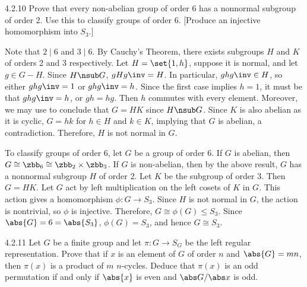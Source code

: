 \begin{exercise}{4.2.10}
	Prove that every non-abelian group of order 6 has a nonnormal subgroup of order 2.
	Use this to classify groups of order 6. [Produce an injective homomorphism into $S_3$.]
\end{exercise}

\begin{sol}
	Note that $2 \mid 6$ and $3 \mid 6$.
	By Cauchy's Theorem, there exists subgroups $H$ and $K$ of orders 2 and 3 respectively.
	Let $H = \set{1, h}$, suppose it is normal, and let $g \in G - H$.
	Since $H \nsub G$, $gHg\inv = H$.
	In particular, $ghg\inv \in H$, so either $ghg\inv = 1$ or $ghg\inv = h$.
	Since the first case implies $h = 1$, it must be that $ghg\inv = h$, or $gh = hg$.
	Then $h$ commutes with every element.
	Moreover, we may use  to conclude that $G = HK$ since $H \nsub G$.
	Since $K$ is also abelian as it is cyclic, $G = hk$ for $h \in H$ and $k \in K$, implying that $G$ is abelian, a contradiction.
	Therefore, $H$ is not normal in $G$.

	To classify groups of order 6, let $G$ be a group of order 6.
	If $G$ is abelian, then $G \cong \zbb_6 \cong \zbb_2 \times \zbb_3$.
	If $G$ is non-abelian, then by the above result, $G$ has a nonnormal subgroup $H$ of order 2.
	Let $K$ be the subgroup of order 3.
	Then $G = HK$.
	Let $G$ act by left multiplication on the left cosets of $K$ in $G$.
	This action gives a homomorphism $\phi \colon G \to S_3$.
	Since $H$ is not normal in $G$, the action is nontrivial, so $\phi$ is injective.
	Therefore, $G \cong \phi(G) \leq S_3$.
	Since $\abs{G} = 6 = \abs{S_3}$, $\phi(G) = S_3$, and hence $G \cong S_3$.
\end{sol}

\begin{exercise}{4.2.11}
	Let $G$ be a finite group and let $\pi \colon G \to S_G$ be the left regular representation.
	Prove that if $x$ is an element of $G$ of order $n$ and $\abs{G} = mn$, then $\pi(x)$ is a product of $m$ $n$-cycles.
	Deduce that $\pi(x)$ is an odd permutation if and only if $\abs{x}$ is even and $\abs G/\abs x$ is odd.
\end{exercise}

